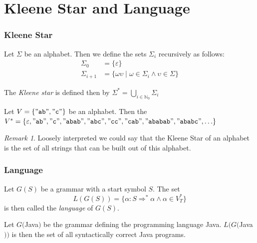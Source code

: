 \documentclass{beamer}
\theoremstyle{remark}
\newtheorem{remark}[theorem]{Remark}
\newcommand{\emptystring}{\varepsilon}
\begin{document}
\section{Kleene Star and Language}
\begin{frame}
	\frametitle{Kleene Star}
	
	\begin{definition}
		Let $\Sigma$ be an alphabet. Then we define the sets $\Sigma_i$ recursively as follows:
		\begin{align*}
			\Sigma_0 & =  \{\emptystring\} \\
			\Sigma_{i + 1} & =  \{\omega\upsilon \mid \omega \in \Sigma_{i} \land \upsilon \in \Sigma\}
		\end{align*}
		
		The {\em Kleene star} is defined then by $\Sigma^* = \underset{i \in \mathbb{N}_0}{\bigcup}\Sigma_i$
	\end{definition}
	
	\pause
	
	\begin{example}
		Let $V = \{"\mathtt{ab}", "\mathtt{c}"\}$ be an alphabet. Then the $V^* = \{\emptystring, "\mathtt{ab}", "\mathtt{c}", "\mathtt{abab}", "\mathtt{abc}", "\mathtt{cc}", "\mathtt{cab}", "\mathtt{ababab}", "\mathtt{ababc}", \ldots\}$
	\end{example}
	
	\pause
	
	\begin{remark}
		Loosely interpreted we could say that the Kleene Star of an alphabet is the set of all strings that can be built out of this alphabet.
	\end{remark}
\end{frame}

\begin{frame}
	\frametitle{Language}
	\begin{definition}
		Let $G(S)$ be a grammar with a start symbol $S$. The set
		\[L(G(S)) =  \{\alpha: S \Rightarrow^* \alpha \land \alpha \in V_T^*\}\]
		is then called the {\em language} of $G(S)$.
	\end{definition}
	
	\pause
	
	\begin{example}
		Let $G($Java$)$ be the grammar defining the programming language Java. $L(G($Java$))$ is then
		\pause
		the set of all syntactically correct Java programs.
	\end{example}
\end{frame}
\end{document}
